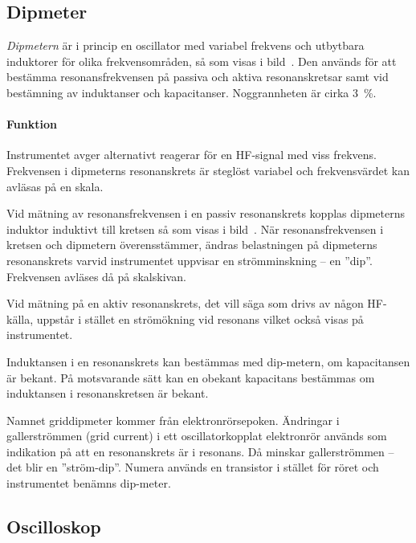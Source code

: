 \subsection{Dipmeter}



\emph{Dipmetern} är i princip en oscillator med variabel frekvens och utbytbara
induktorer för olika frekvensområden, så som visas i bild~.
Den används för att bestämma resonansfrekvensen på passiva och aktiva
resonanskretsar samt vid bestämning av induktanser och kapacitanser.
Noggrannheten är cirka 3~\%.

\paragraph{Funktion}
Instrumentet avger alternativt reagerar för en HF-signal med viss frekvens.
Frekvensen i dipmeterns resonanskrets är steglöst variabel och frekvensvärdet
kan avläsas på en skala.

Vid mätning av resonansfrekvensen i en passiv resonanskrets kopplas dipmeterns
induktor induktivt till kretsen så som visas i bild~.
När resonansfrekvensen i kretsen och dipmetern överensstämmer, ändras 
belastningen på dipmeterns resonanskrets varvid instrumentet uppvisar en
strömminskning -- en ''dip''.
Frekvensen avläses då på skalskivan.

Vid mätning på en aktiv resonanskrets, det vill säga som drivs av någon
HF-källa, uppstår i stället en strömökning vid resonans vilket också visas på
instrumentet.

Induktansen i en resonanskrets kan bestämmas med dip-metern, om kapacitansen
är bekant.
På motsvarande sätt kan en obekant kapacitans bestämmas om induktansen i
resonanskretsen är bekant.

Namnet griddipmeter kommer från elektronrörsepoken.
Ändringar i gallerströmmen (grid current) i ett oscillatorkopplat elektronrör
används som indikation på att en resonanskrets är i resonans.
Då minskar gallerströmmen -- det blir en ''ström-dip''.
Numera används en transistor i stället för röret och instrumentet benämns
dip-meter.

\subsection{Oscilloskop}

